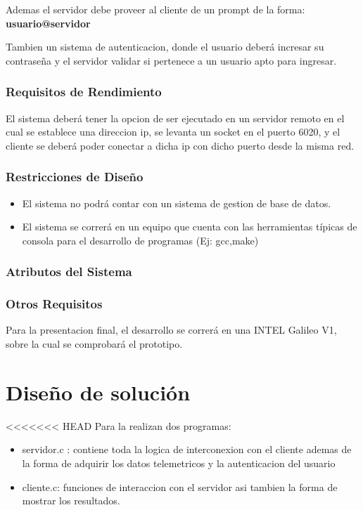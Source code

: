 \documentclass[10pt, a4paper,notitlepage]{article}
\begin{document}
{Ademas el servidor debe proveer al cliente de un prompt de la forma:
\textbf{usuario@servidor}

Tambien un sistema de autenticacion, donde el usuario deberá incresar su contraseña y el servidor validar si pertenece a un usuario apto para ingresar.
\subsubsection{Requisitos de Rendimiento}
El sistema deberá tener la opcion de ser ejecutado en un servidor remoto en el cual se establece una direccion ip, se levanta un socket en el puerto 6020, y el cliente se deberá poder conectar a dicha ip con dicho puerto desde la misma red.
\subsubsection{Restricciones de Diseño}
\begin{itemize}
	\item El sistema no podrá contar con un sistema de gestion de base de datos.
	\item El sistema se correrá en un equipo que cuenta con las herramientas típicas de consola para el desarrollo de programas (Ej: gcc,make)
\end{itemize}


\subsubsection{Atributos del Sistema}
\subsubsection{Otros Requisitos }
Para la presentacion final, el desarrollo se correrá en una INTEL Galileo V1, sobre la cual se comprobará el prototipo.
\section{ Diseño de solución}
<<<<<<< HEAD
Para la realizan dos programas:
\begin{itemize}
	\item servidor.c : contiene toda la logica de interconexion con el cliente ademas de la forma de adquirir los datos telemetricos y la autenticacion del usuario
	\item cliente.c: funciones de interaccion con el servidor asi tambien la forma de mostrar los resultados.
\end{itemize}

}
\end{document}
